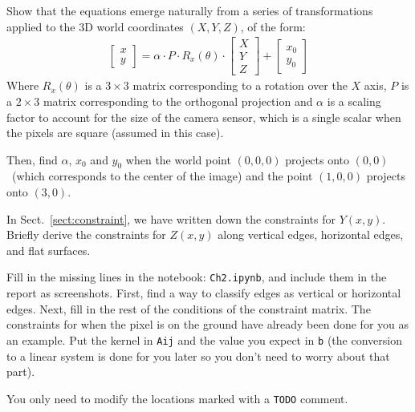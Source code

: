 Show that the  equations emerge naturally from a series of transformations
applied to the 3D world coordinates $(X,Y,Z)$, of the form:
\begin{gather}
\left[
  \begin{array}{c}
    x \\
    y
  \end{array}
\right] = \alpha \cdot P \cdot R_x(\theta) \cdot
\left[
  \begin{array}{ccc}
    X \\
    Y \\
    Z
  \end{array}
\right] +
\left[
  \begin{array}{c}
    x_0 \\
    y_0
  \end{array}
\right]
\end{gather}
Where $R_x(\theta)$ is a $3\times 3$ matrix corresponding to a rotation over the $X$ axis, $P$ is a $2 \times 3$ matrix corresponding to the orthogonal projection and $\alpha$ is  a scaling factor to account for the size
of the
camera sensor, which is a single scalar when the pixels are square (assumed in this case).  

Then, find $\alpha$, $x_0$ and $y_0$ when the world point $(0, 0, 0)$ projects onto  $(0, 0)$ \ (which corresponds to the center of the image) and the point $(1, 0, 0)$ projects onto $(3, 0)$.




In Sect.~\ref{sect:constraint}, we have written down the constraints for $Y(x, y)$. Briefly derive the constraints for $Z(x, y)$ along vertical edges, horizontal edges, and flat surfaces.



Fill in the missing lines in the notebook: \texttt{Ch2.ipynb}, and include them in the report as screenshots. First, find a way to classify edges as vertical or horizontal edges. Next, fill in the rest of the conditions of the constraint matrix. The constraints for when the pixel is on the ground have already been done for you as an example. Put the kernel in \texttt{Aij} and the value you expect in \texttt{b} (the conversion to a linear system is done for you later so you don't need to worry about that part).

You only need to modify the locations marked with a \texttt{TODO} comment.


